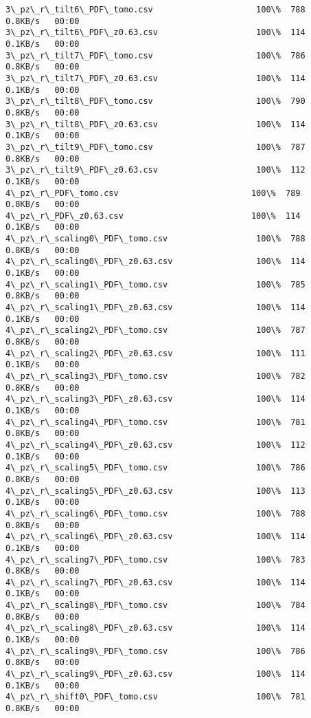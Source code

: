 \documentclass[11pt]{article}
\begin{document}
\begin{Verbatim}[commandchars=\\\{\}]
3\_pz\_r\_tilt6\_PDF\_tomo.csv                     100\%  788     0.8KB/s   00:00    
3\_pz\_r\_tilt6\_PDF\_z0.63.csv                    100\%  114     0.1KB/s   00:00    
3\_pz\_r\_tilt7\_PDF\_tomo.csv                     100\%  786     0.8KB/s   00:00    
3\_pz\_r\_tilt7\_PDF\_z0.63.csv                    100\%  114     0.1KB/s   00:00    
3\_pz\_r\_tilt8\_PDF\_tomo.csv                     100\%  790     0.8KB/s   00:00    
3\_pz\_r\_tilt8\_PDF\_z0.63.csv                    100\%  114     0.1KB/s   00:00    
3\_pz\_r\_tilt9\_PDF\_tomo.csv                     100\%  787     0.8KB/s   00:00    
3\_pz\_r\_tilt9\_PDF\_z0.63.csv                    100\%  112     0.1KB/s   00:00    
4\_pz\_r\_PDF\_tomo.csv                           100\%  789     0.8KB/s   00:00    
4\_pz\_r\_PDF\_z0.63.csv                          100\%  114     0.1KB/s   00:00    
4\_pz\_r\_scaling0\_PDF\_tomo.csv                  100\%  788     0.8KB/s   00:00    
4\_pz\_r\_scaling0\_PDF\_z0.63.csv                 100\%  114     0.1KB/s   00:00    
4\_pz\_r\_scaling1\_PDF\_tomo.csv                  100\%  785     0.8KB/s   00:00    
4\_pz\_r\_scaling1\_PDF\_z0.63.csv                 100\%  114     0.1KB/s   00:00    
4\_pz\_r\_scaling2\_PDF\_tomo.csv                  100\%  787     0.8KB/s   00:00    
4\_pz\_r\_scaling2\_PDF\_z0.63.csv                 100\%  111     0.1KB/s   00:00    
4\_pz\_r\_scaling3\_PDF\_tomo.csv                  100\%  782     0.8KB/s   00:00    
4\_pz\_r\_scaling3\_PDF\_z0.63.csv                 100\%  114     0.1KB/s   00:00    
4\_pz\_r\_scaling4\_PDF\_tomo.csv                  100\%  781     0.8KB/s   00:00    
4\_pz\_r\_scaling4\_PDF\_z0.63.csv                 100\%  112     0.1KB/s   00:00    
4\_pz\_r\_scaling5\_PDF\_tomo.csv                  100\%  786     0.8KB/s   00:00    
4\_pz\_r\_scaling5\_PDF\_z0.63.csv                 100\%  113     0.1KB/s   00:00    
4\_pz\_r\_scaling6\_PDF\_tomo.csv                  100\%  788     0.8KB/s   00:00    
4\_pz\_r\_scaling6\_PDF\_z0.63.csv                 100\%  114     0.1KB/s   00:00    
4\_pz\_r\_scaling7\_PDF\_tomo.csv                  100\%  783     0.8KB/s   00:00    
4\_pz\_r\_scaling7\_PDF\_z0.63.csv                 100\%  114     0.1KB/s   00:00    
4\_pz\_r\_scaling8\_PDF\_tomo.csv                  100\%  784     0.8KB/s   00:00    
4\_pz\_r\_scaling8\_PDF\_z0.63.csv                 100\%  114     0.1KB/s   00:00    
4\_pz\_r\_scaling9\_PDF\_tomo.csv                  100\%  786     0.8KB/s   00:00    
4\_pz\_r\_scaling9\_PDF\_z0.63.csv                 100\%  114     0.1KB/s   00:00    
4\_pz\_r\_shift0\_PDF\_tomo.csv                    100\%  781     0.8KB/s   00:00    

\end{Verbatim}
\end{document}
